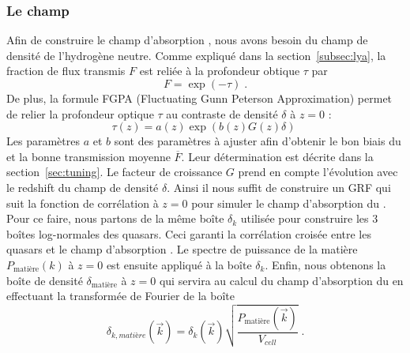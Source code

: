 \subsubsection{Le champ \lya{}}
Afin de construire le champ d'absorption \lya{}, nous avons besoin du champ de densité de l'hydrogène neutre. Comme expliqué dans la section~\ref{subsec:lya}, la fraction de flux transmis $F$ est reliée à la profondeur obtique $\tau$ par
\begin{equation}
  F = \exp(- \tau) \; .
\end{equation}
De plus, la formule FGPA (Fluctuating Gunn Peterson Approximation) permet de relier la profondeur optique $\tau$ au contraste de densité $\delta$ à $z = 0$ :
\begin{equation}
  \label{eq:fgpa1}
  \tau(z) = a(z) \exp(b(z) G(z) \delta) \;
\end{equation}
Les paramètres $a$ et $b$ sont des paramètres à ajuster afin d'obtenir le bon biais du \lya{} et la bonne transmission moyenne $\overline F$. Leur détermination est décrite dans la section~\ref{sec:tuning}. Le facteur de croissance $G$ prend en compte l'évolution avec le redshift du champ de densité $\delta$. Ainsi il nous suffit de construire un GRF qui suit la fonction de corrélation à $z=0$ pour simuler le champ d'absorption du \lya{}. Pour ce faire, nous partons de la même boîte $\delta_k$ utilisée pour construire les 3 boîtes log-normales des quasars. Ceci garanti la corrélation croisée entre les quasars et le champ d'absorption \lya{}. Le spectre de puissance de la matière $P_{\mathrm{matière}}(k)$ à $z=0$ est ensuite appliqué à la boîte $\delta_k$. Enfin, nous obtenons la boîte de densité $\delta_{\mathrm{matière}}$ à $z = 0$ qui servira au calcul du champ d'absorption du \lya{} en effectuant la transformée de Fourier de la boîte
\begin{equation}
  \delta_{k, matière}(\vec k)  = \delta_k(\vec k) \sqrt{\frac{P_{\mathrm{matière}}(\vec k)}{V_{cell}}} \; .
\end{equation}


